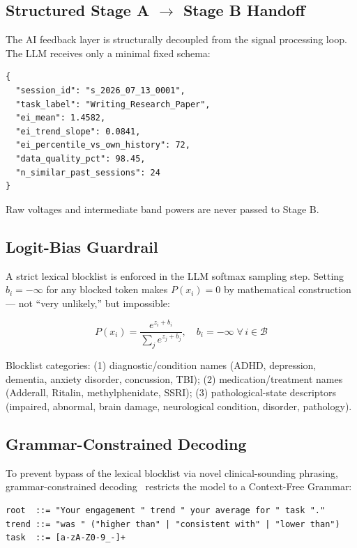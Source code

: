 \documentclass[11pt]{article}
\begin{document}
\subsection{Structured Stage A $\to$ Stage B Handoff}

The AI feedback layer is structurally decoupled from the signal processing loop. The LLM receives only a minimal fixed schema:

\begin{verbatim}
{
  "session_id": "s_2026_07_13_0001",
  "task_label": "Writing_Research_Paper",
  "ei_mean": 1.4582,
  "ei_trend_slope": 0.0841,
  "ei_percentile_vs_own_history": 72,
  "data_quality_pct": 98.45,
  "n_similar_past_sessions": 24
}
\end{verbatim}

Raw voltages and intermediate band powers are never passed to Stage B.

\subsection{Logit-Bias Guardrail}

A strict lexical blocklist is enforced in the LLM softmax sampling step. Setting $b_i = -\infty$ for any blocked token makes $P(x_i) = 0$ by mathematical construction --- not ``very unlikely,'' but impossible:

\begin{equation}
P(x_i) = \frac{e^{z_i + b_i}}{\sum_j e^{z_j + b_j}}, \quad b_i = -\infty \;\forall\, i \in \mathcal{B}
\end{equation}

Blocklist categories: (1) diagnostic/condition names (ADHD, depression, dementia, anxiety disorder, concussion, TBI); (2) medication/treatment names (Adderall, Ritalin, methylphenidate, SSRI); (3) pathological-state descriptors (impaired, abnormal, brain damage, neurological condition, disorder, pathology).

\subsection{Grammar-Constrained Decoding}

To prevent bypass of the lexical blocklist via novel clinical-sounding phrasing, grammar-constrained decoding~\cite{willard2023} restricts the model to a Context-Free Grammar:

\begin{verbatim}
root  ::= "Your engagement " trend " your average for " task "."
trend ::= "was " ("higher than" | "consistent with" | "lower than")
task  ::= [a-zA-Z0-9_-]+
\end{verbatim}
\end{document}
